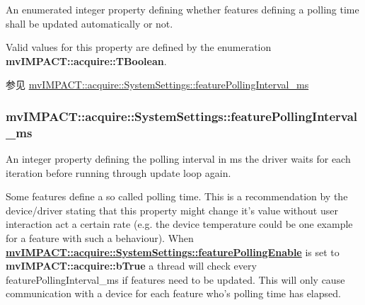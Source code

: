An enumerated integer property defining whether features defining a polling time shall be updated automatically or not. 

Valid values for this property are defined by the enumeration {\bfseries mv\+I\+M\+P\+A\+C\+T\+::acquire\+::\+T\+Boolean}.

\begin{DoxySeeAlso}{参见}
\hyperlink{classmv_i_m_p_a_c_t_1_1acquire_1_1_system_settings_a0dcec7c243f9dc081e51da6842e3a0a4}{mv\+I\+M\+P\+A\+C\+T\+::acquire\+::\+System\+Settings\+::feature\+Polling\+Interval\+\_\+ms} 
\end{DoxySeeAlso}
\hypertarget{classmv_i_m_p_a_c_t_1_1acquire_1_1_system_settings_a0dcec7c243f9dc081e51da6842e3a0a4}{
\subsubsection[{feature\+Polling\+Interval\+\_\+ms}]{ mv\+I\+M\+P\+A\+C\+T\+::acquire\+::\+System\+Settings\+::feature\+Polling\+Interval\+\_\+ms}}\label{classmv_i_m_p_a_c_t_1_1acquire_1_1_system_settings_a0dcec7c243f9dc081e51da6842e3a0a4}


An integer property defining the polling interval in ms the driver waits for each iteration before running through update loop again. 

Some features define a so called {\ttfamily polling} {\ttfamily time}. This is a recommendation by the device/driver stating that this property might change it's value without user interaction act a certain rate (e.\+g. the device temperature could be one example for a feature with such a behaviour). When {\bfseries \hyperlink{classmv_i_m_p_a_c_t_1_1acquire_1_1_system_settings_a527250faf209d3f965146a88ea3a4369}{mv\+I\+M\+P\+A\+C\+T\+::acquire\+::\+System\+Settings\+::feature\+Polling\+Enable}} is set to {\bfseries mv\+I\+M\+P\+A\+C\+T\+::acquire\+::b\+True} a thread will check every {\ttfamily feature\+Polling\+Interval\+\_\+ms} if features need to be updated. This will only cause communication with a device for each feature who's polling time has elapsed.

